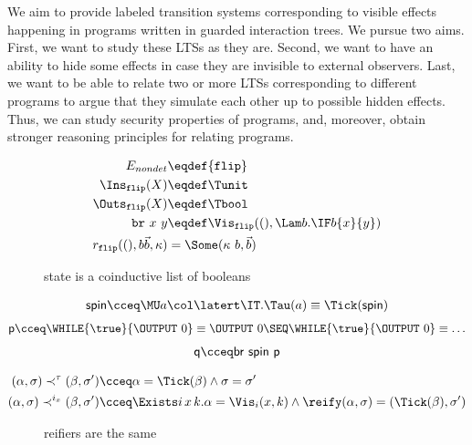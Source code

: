 We aim to provide labeled transition systems corresponding
to visible effects happening in programs written in guarded interaction
trees. We pursue two aims. First, we want to study these LTSs as they are.
Second, we want to have an ability to hide some effects in case they are
invisible to external observers. Last, we want to be able to relate
two or more LTSs corresponding to different programs to argue
that they simulate each other up to possible hidden effects.
Thus, we can study security properties of programs, and, moreover,
obtain stronger reasoning principles for relating programs.

\begin{figure}
  \begin{align*}
    E_{nondet} &\eqdef \{\mathtt{flip}\} \\
    \Ins_{\mathtt{flip}}(X) &\eqdef \Tunit \\
    \Outs_{\mathtt{flip}}(X) &\eqdef \Tbool \\
    \mathtt{br}~x~y & \eqdef \Vis_{\mathtt{flip}}((), \Lam b. \IF b \{ x \} \{ y \}) \\
    r_{\mathtt{flip}}((),b\vec{b},\kappa) &= \Some(\kappa~b, \vec{b})
  \end{align*}
  \caption{state is a coinductive list of booleans}
\end{figure}

\begin{align*}
  \mathsf{spin} \cceq \MU a \col \latert \IT. \Tau(a) \equiv \Tick(\mathsf{spin})
\end{align*}
\begin{align*}
  \mathsf{p} \cceq \WHILE{\true}{\OUTPUT~0} \equiv \OUTPUT~0 \SEQ \WHILE{\true}{\OUTPUT~0} \equiv \dots
\end{align*}
\begin{align*}
  \mathsf{q} \cceq \mathsf{br}~\mathsf{spin}~\mathsf{p}
\end{align*}

\begin{align*}
  (\alpha, \sigma) \prec^{\tau} (\beta, \sigma') & \cceq \alpha = \Tick(\beta) \wedge \sigma = \sigma' \\
  (\alpha, \sigma) \prec^{i_{x}} (\beta, \sigma') & \cceq \Exists i\,x\,k. \alpha = \Vis_i(x,k)
    \wedge \reify(\alpha,\sigma) = (\Tick(\beta),\sigma')
\end{align*}

\begin{figure}
  \caption{reifiers are the same}
\end{figure}

